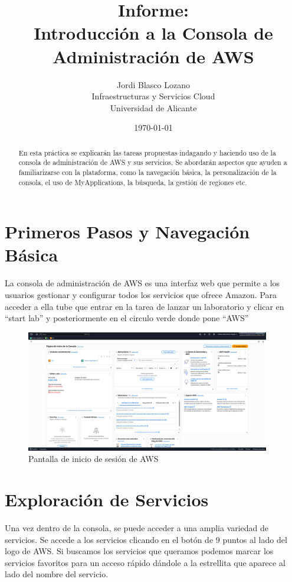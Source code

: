 \documentclass{article}
\title{Informe: \\ Introducción a la Consola de Administración de AWS}
\author{
	Jordi Blasco Lozano \\
	\small Infraestructuras y Servicios Cloud \\
	\small Universidad de Alicante
}
\date{\today}
\begin{document}
	
	\maketitle

	\begin{abstract}
	\noindent En esta práctica se explicarán las tareas propuestas indagando y haciendo uso de la consola de administración de AWS y sus servicios. Se abordarán aspectos que ayuden a familiarizarse con la plataforma, como la navegación básica, la personalización de la consola, el uso de MyApplications, la búsqueda, la gestión de regiones etc.
	\end{abstract}

	\tableofcontents

	\newpage

	\section{Primeros Pasos y Navegación Básica}

	La consola de administración de AWS es una interfaz web que permite a los usuarios gestionar y configurar todos los servicios que ofrece Amazon. Para acceder a ella tube que entrar en la tarea de lanzar un laboratorio y clicar en ``start lab'' y posteriormente en el circulo verde donde pone ``AWS''

	\begin{figure}[h!]
	\centering
	\includegraphics[width=0.95\textwidth]{tarea_1.png}
	\caption{Pantalla de inicio de sesión de AWS}
	\end{figure}

	\section{Exploración de Servicios}

	Una vez dentro de la consola, se puede acceder a una amplia variedad de servicios. Se accede a los servicios clicando en el botón de 9 puntos al lado del logo de AWS. Si buscamos los servicios que queramos podemos marcar los servicios favoritos para un acceso rápido dándole a la estrellita que aparece al lado del nombre del servicio.
\end{document}
